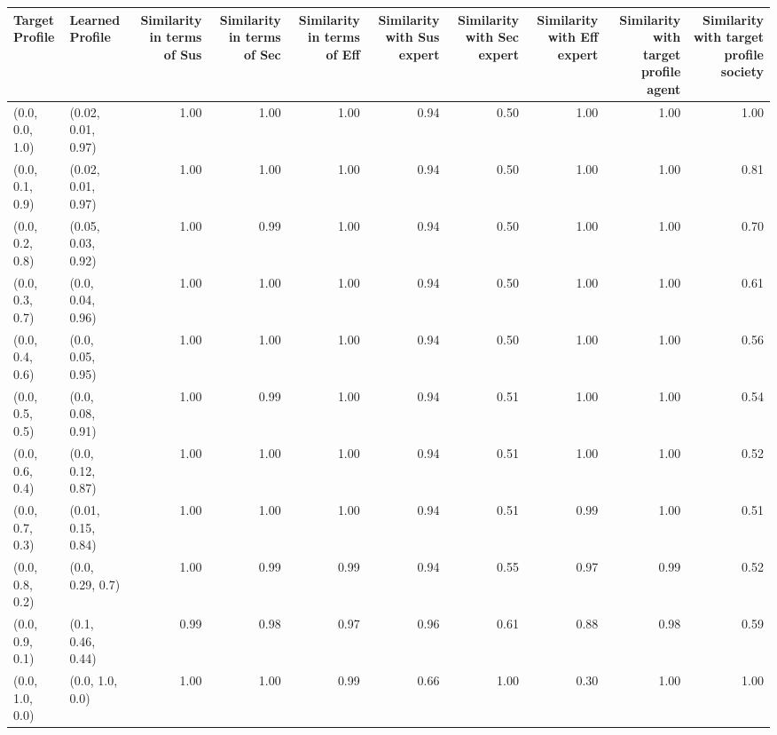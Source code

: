 \begin{tabular}{llrrrrrrrr}
\toprule
Target Profile & Learned Profile & Similarity in terms of Sus & Similarity in terms of Sec & Similarity in terms of Eff & Similarity with Sus expert & Similarity with Sec expert & Similarity with Eff expert & Similarity with target profile agent & Similarity with target profile society \\
\midrule
(0.0, 0.0, 1.0) & (0.02, 0.01, 0.97) & 1.00 & 1.00 & 1.00 & 0.94 & 0.50 & 1.00 & 1.00 & 1.00 \\
(0.0, 0.1, 0.9) & (0.02, 0.01, 0.97) & 1.00 & 1.00 & 1.00 & 0.94 & 0.50 & 1.00 & 1.00 & 0.81 \\
(0.0, 0.2, 0.8) & (0.05, 0.03, 0.92) & 1.00 & 0.99 & 1.00 & 0.94 & 0.50 & 1.00 & 1.00 & 0.70 \\
(0.0, 0.3, 0.7) & (0.0, 0.04, 0.96) & 1.00 & 1.00 & 1.00 & 0.94 & 0.50 & 1.00 & 1.00 & 0.61 \\
(0.0, 0.4, 0.6) & (0.0, 0.05, 0.95) & 1.00 & 1.00 & 1.00 & 0.94 & 0.50 & 1.00 & 1.00 & 0.56 \\
(0.0, 0.5, 0.5) & (0.0, 0.08, 0.91) & 1.00 & 0.99 & 1.00 & 0.94 & 0.51 & 1.00 & 1.00 & 0.54 \\
(0.0, 0.6, 0.4) & (0.0, 0.12, 0.87) & 1.00 & 1.00 & 1.00 & 0.94 & 0.51 & 1.00 & 1.00 & 0.52 \\
(0.0, 0.7, 0.3) & (0.01, 0.15, 0.84) & 1.00 & 1.00 & 1.00 & 0.94 & 0.51 & 0.99 & 1.00 & 0.51 \\
(0.0, 0.8, 0.2) & (0.0, 0.29, 0.7) & 1.00 & 0.99 & 0.99 & 0.94 & 0.55 & 0.97 & 0.99 & 0.52 \\
(0.0, 0.9, 0.1) & (0.1, 0.46, 0.44) & 0.99 & 0.98 & 0.97 & 0.96 & 0.61 & 0.88 & 0.98 & 0.59 \\
(0.0, 1.0, 0.0) & (0.0, 1.0, 0.0) & 1.00 & 1.00 & 0.99 & 0.66 & 1.00 & 0.30 & 1.00 & 1.00 \\
\bottomrule
\end{tabular}
